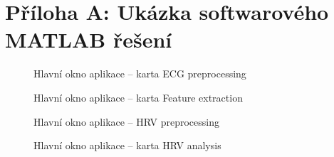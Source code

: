 \section*{Příloha A: Ukázka softwarového MATLAB řešení}
\label{att:sw_matlab}

\begin{figure}[H]
    \begin{center}
        \textcolor{cyan}{\fboxrule=0.3pt\fboxsep=0pt}
        \caption{Hlavní okno aplikace -- karta ECG preprocessing}
        \label{fig:results_matlab_tab1}
    \end{center}
\end{figure}

\begin{figure}[H]
    \begin{center}
        \textcolor{cyan}{\fboxrule=0.3pt\fboxsep=0pt}
        \caption{Hlavní okno aplikace -- karta Feature extraction}
        \label{fig:results_matlab_tab2}
    \end{center}
\end{figure}

\begin{figure}[H]
    \begin{center}
        \textcolor{cyan}{\fboxrule=0.3pt\fboxsep=0pt}
        \caption{Hlavní okno aplikace -- HRV preprocessing}
        \label{fig:results_matlab_tab3}
    \end{center}
\end{figure}

\begin{figure}[H]
    \begin{center}
        \textcolor{cyan}{\fboxrule=0.3pt\fboxsep=0pt}
        \caption{Hlavní okno aplikace -- karta HRV analysis}
        \label{fig:results_matlab_tab4_}
    \end{center}
\end{figure}

\clearpage


